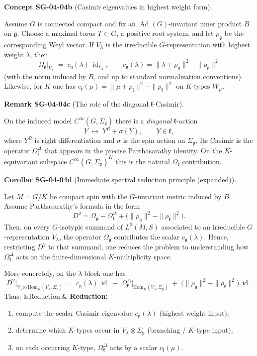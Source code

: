 \documentclass[10pt, letterpaper]{article}
\newcommand{\id}{\operatorname{id}}
\newcommand{\Ad}{\operatorname{Ad}}
\newcommand{\Cinf}{C^{\infty}}
\newcommand{\Hom}{\mathrm{Hom}}
\newenvironment{romanenum}[1][]
  {%
    \ifx&#1&
    \else
      \textbf{#1}\quad
    \fi
    \begin{enumerate}[label=\roman*)]
  }
  {%
    \end{enumerate}%
  }
\newcommand{\CustomHeading}[3]{%
  \par\medskip\noindent%
  \textbf{#1 #2} \textnormal{(#3)}.\enskip%
}
\newenvironment{KORO}[2]{\begin{unitbox}\CustomHeading{Corollar}{#1}{#2}}{\end{unitbox}}
\newenvironment{REM}[2]{\begin{unitbox}\CustomHeading{Remark}{#1}{#2}}{\end{unitbox}}
\newenvironment{CONC}[2]{\begin{unitbox}\CustomHeading{Concept}{#1}{#2}}{\end{unitbox}}
\begin{document}
\begin{CONC}{SG-04-04b}{Casimir eigenvalues in highest weight form}
Assume $G$ is connected compact and fix an $\Ad(G)$-invariant inner product $B$ on $\mathfrak g$.
Choose a maximal torus $T\subset G$, a positive root system, and let $\rho_{\mathfrak g}$ be the corresponding Weyl vector.
If $V_\lambda$ is the irreducible $G$-representation with highest weight $\lambda$, then
\[
\Omega_{\mathfrak g}\big|_{V_\lambda}
\;=\;
c_{\mathfrak g}(\lambda)\,\id_{V_\lambda},
\qquad
c_{\mathfrak g}(\lambda)=\|\lambda+\rho_{\mathfrak g}\|^2-\|\rho_{\mathfrak g}\|^2
\]
(with the norm induced by $B$, and up to standard normalization conventions).
Likewise, for $K$ one has $c_{\mathfrak k}(\mu)=\|\mu+\rho_{\mathfrak k}\|^2-\|\rho_{\mathfrak k}\|^2$ on $K$-types $W_\mu$.
\end{CONC}

\begin{REM}{SG-04-04c}{The role of the diagonal $\mathfrak k$-Casimir}
On the induced model $\Cinf(G,\Sigma_{\mathfrak p})$ there is a \emph{diagonal} $\mathfrak k$-action
\[
Y \;\mapsto\; Y^R + \sigma(Y),\qquad Y\in\mathfrak k,
\]
where $Y^R$ is right differentiation and $\sigma$ is the spin action on $\Sigma_{\mathfrak p}$.
Its Casimir is the operator $\Omega_{\mathfrak k}^{\Delta}$ that appears in the precise Parthasarathy identity.
On the $K$-equivariant subspace $\Cinf(G,\Sigma_{\mathfrak p})^K$ this is the natural $\Omega_{\mathfrak k}$ contribution.
\end{REM}

\begin{KORO}{SG-04-04d}{Immediate spectral reduction principle (expanded)}
Let $M=G/K$ be compact spin with the $G$-invariant metric induced by $B$.
Assume Parthasarathy's formula in the form
\[
D^2 = \Omega_{\mathfrak g} - \Omega_{\mathfrak k}^{\Delta} + \big(\|\rho_{\mathfrak g}\|^2-\|\rho_{\mathfrak k}\|^2\big).
\]
Then, on every $G$-isotypic summand of $L^2(M,S)$ associated to an irreducible $G$-representation $V_\lambda$,
the operator $\Omega_{\mathfrak g}$ contributes the scalar $c_{\mathfrak g}(\lambda)$.
Hence, restricting $D^2$ to that summand, one reduces the problem to understanding how
$\Omega_{\mathfrak k}^{\Delta}$ acts on the finite-dimensional $K$-multiplicity space.

More concretely, on the $\lambda$-block one has
\[
D^2\Big|_{V_\lambda\otimes \Hom_K(V_\lambda,\Sigma_{\mathfrak p})}
\;=\;
c_{\mathfrak g}(\lambda)\,\id
\;-\;
\Omega_{\mathfrak k}^{\Delta}\Big|_{\Hom_K(V_\lambda,\Sigma_{\mathfrak p})}
\;+\;
\big(\|\rho_{\mathfrak g}\|^2-\|\rho_{\mathfrak k}\|^2\big)\,\id.
\]
Thus:
\begin{romanenum}[Reduction:]
\item compute the scalar Casimir eigenvalue $c_{\mathfrak g}(\lambda)$ (highest weight input);
\item determine which $K$-types occur in $V_\lambda\otimes \Sigma_{\mathfrak p}$ (branching / $K$-type input);
\item on each occurring $K$-type, $\Omega_{\mathfrak k}^{\Delta}$ acts by a scalar $c_{\mathfrak k}(\mu)$.
\end{romanenum}
\end{KORO}
\end{document}
